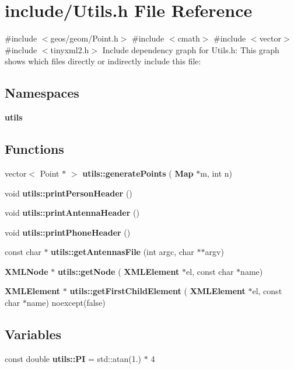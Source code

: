 \section{include/\+Utils.h File Reference}
\label{_utils_8h}
{\ttfamily \#include $<$geos/geom/\+Point.\+h$>$}\newline
{\ttfamily \#include $<$cmath$>$}\newline
{\ttfamily \#include $<$vector$>$}\newline
{\ttfamily \#include $<$tinyxml2.\+h$>$}\newline
Include dependency graph for Utils.\+h\+:
This graph shows which files directly or indirectly include this file\+:
\subsection*{Namespaces}
\begin{DoxyCompactItemize}
\item 
 \textbf{ utils}
\end{DoxyCompactItemize}
\subsection*{Functions}
\begin{DoxyCompactItemize}
\item 
vector$<$ Point $\ast$ $>$ \textbf{ utils\+::generate\+Points} (\textbf{ Map} $\ast$m, int n)
\item 
void \textbf{ utils\+::print\+Person\+Header} ()
\item 
void \textbf{ utils\+::print\+Antenna\+Header} ()
\item 
void \textbf{ utils\+::print\+Phone\+Header} ()
\item 
const char $\ast$ \textbf{ utils\+::get\+Antennas\+File} (int argc, char $\ast$$\ast$argv)
\item 
\textbf{ X\+M\+L\+Node} $\ast$ \textbf{ utils\+::get\+Node} (\textbf{ X\+M\+L\+Element} $\ast$el, const char $\ast$name)
\item 
\textbf{ X\+M\+L\+Element} $\ast$ \textbf{ utils\+::get\+First\+Child\+Element} (\textbf{ X\+M\+L\+Element} $\ast$el, const char $\ast$name) noexcept(false)
\end{DoxyCompactItemize}
\subsection*{Variables}
\begin{DoxyCompactItemize}
\item 
const double \textbf{ utils\+::\+PI} = std\+::atan(1.) $\ast$ 4
\end{DoxyCompactItemize}
